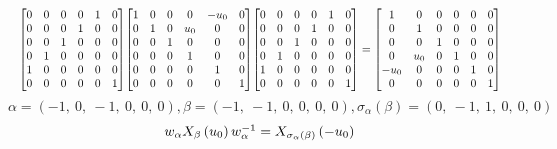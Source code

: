 \documentclass[11pt]{article}
\theoremstyle{definition}
\begin{document}
\[
\scaletoalign{\textwidth}{{\left[\begin{matrix}0 & 0 & 0 & 0 & 1 & 0\\0 & 0 & 0 & 1 & 0 & 0\\0 & 0 & 1 & 0 & 0 & 0\\0 & 1 & 0 & 0 & 0 & 0\\1 & 0 & 0 & 0 & 0 & 0\\0 & 0 & 0 & 0 & 0 & 1\end{matrix}\right]} {\left[\begin{matrix}1 & 0 & 0 & 0 & - u_{0} & 0\\0 & 1 & 0 & u_{0} & 0 & 0\\0 & 0 & 1 & 0 & 0 & 0\\0 & 0 & 0 & 1 & 0 & 0\\0 & 0 & 0 & 0 & 1 & 0\\0 & 0 & 0 & 0 & 0 & 1\end{matrix}\right]} {\left[\begin{matrix}0 & 0 & 0 & 0 & 1 & 0\\0 & 0 & 0 & 1 & 0 & 0\\0 & 0 & 1 & 0 & 0 & 0\\0 & 1 & 0 & 0 & 0 & 0\\1 & 0 & 0 & 0 & 0 & 0\\0 & 0 & 0 & 0 & 0 & 1\end{matrix}\right]} = {\left[\begin{matrix}1 & 0 & 0 & 0 & 0 & 0\\0 & 1 & 0 & 0 & 0 & 0\\0 & 0 & 1 & 0 & 0 & 0\\0 & u_{0} & 0 & 1 & 0 & 0\\- u_{0} & 0 & 0 & 0 & 1 & 0\\0 & 0 & 0 & 0 & 0 & 1\end{matrix}\right]}}
\]
\[
\alpha = \left( -1, \  0, \  -1, \  0, \  0, \  0\right), \beta = \left( -1, \  -1, \  0, \  0, \  0, \  0\right), \sigma_{\alpha}(\beta) = \left( 0, \  -1, \  1, \  0, \  0, \  0\right)
\]
\[
\scaletoalign{\textwidth}{w_{\alpha} X_{\beta}\left(u_{0}\right) w_{\alpha}^{-1} = X_{\sigma_{\alpha}\left(\beta\right)}\left(- u_{0}\right)}
\]
\end{document}
